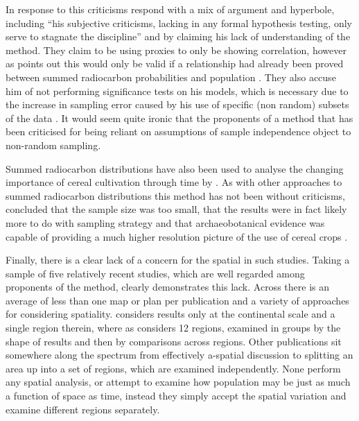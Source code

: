 In response to this criticisms \citet{Timpson2015199} respond with a mix of argument and hyperbole, including ``his subjective criticisms, lacking in any formal hypothesis testing, only serve to stagnate the discipline'' \citep[200]{Timpson2015199} and by claiming his lack of understanding of the method. They claim to be using proxies to only be showing correlation, however as \citet{Torfing2015203} points out this would only be valid if a relationship had already been proved between summed radiocarbon probabilities and population \citep[204]{Torfing2015203}. They also accuse him of not performing significance tests on his models, which is necessary due to the increase in sampling error caused by his use of specific (non random) subsets of the data \citep{Timpson2015199}. It would seem quite ironic that the proponents of a method that has been criticised for being reliant on assumptions of sample independence object to non-random sampling.

Summed radiocarbon distributions have also been used to analyse the changing importance of cereal cultivation through time by \citet{Stevens:2012fk, doi:10.1080/00438243.2015.1087330}. As with other approaches to summed radiocarbon distributions this method has not been without criticisms, \citet{doi:10.1080/00438243.2015.1072477,doi:10.1080/00438243.2015.1093427} concluded that the sample size was too small, that the results were in fact likely more to do with sampling strategy and that archaeobotanical evidence was capable of providing a much higher resolution picture of the use of cereal crops \citep[848]{doi:10.1080/00438243.2015.1072477}. 

Finally, there is a clear lack of a concern for the spatial in such studies. Taking a sample of five relatively recent studies, which are well regarded among proponents of the method, clearly demonstrates this lack. Across \citet{Shennan2013,TIMPSON2014549,10.1371/journal.pone.0105730,Shennan:2013fk,HINZ20123331} there is an average of less than one map or plan per publication and a variety of approaches for considering spatiality. \citet{Shennan2013} considers results only at the continental scale and a single region therein, where as \citet{HINZ20123331} considers 12 regions, examined in groups by the shape of results and then by comparisons across regions. Other publications sit somewhere along the spectrum from effectively a-spatial discussion to splitting an area up into a set of regions, which are examined independently. None perform any spatial analysis, or attempt to examine how population may be just as much a function of space as time, instead they simply accept the spatial variation and examine different regions separately.

